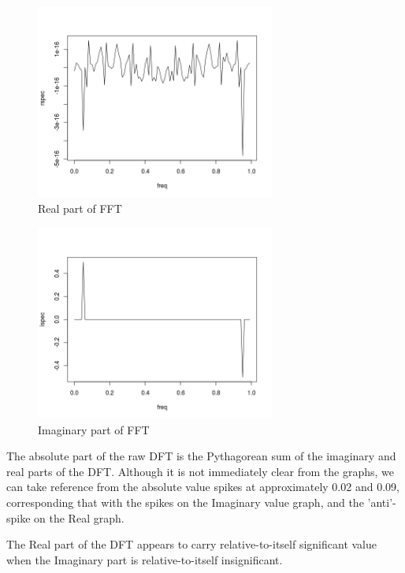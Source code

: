 \documentclass[paper=a4, fontsize=11pt]{scrartcl}
\numberwithin{equation}{section} %
\numberwithin{figure}{section} %
\numberwithin{table}{section} %
\begin{document}
\begin{figure}[htp]
	\centering
	\includegraphics[width=0.7\textwidth, clip]{q1ab.png} 
	\caption{Real part of FFT}
\end{figure}
\pagebreak
\begin{figure}[htp]
	\centering
	\includegraphics[width=0.7\textwidth, clip]{q1ac.png} 
	\caption{Imaginary part of FFT}
\end{figure}

The absolute part of the raw DFT is the Pythagorean sum of the imaginary and real parts of the DFT. Although it is not immediately clear from the graphs, we can take reference from the absolute value spikes at approximately 0.02 and 0.09, corresponding that with the spikes on the Imaginary value graph, and the 'anti'-spike on the Real graph. 

The Real part of the DFT appears to carry relative-to-itself significant value when the Imaginary part is relative-to-itself insignificant.
\end{document}
